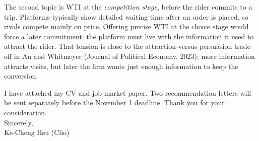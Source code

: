 \documentclass[11pt,letterpaper]{article}
\begin{document}
The second topic is WTI at the \textit{competition stage}, before the rider commits to a trip. Platforms typically show detailed waiting time after an order is placed, so rivals compete mainly on price. Offering precise WTI at the choice stage would force a later commitment: the platform must live with the information it used to attract the rider. That tension is close to the attraction-versus-persuasion trade-off in Au and Whitmeyer (Journal of Political Economy, 2023): more information attracts visits, but later the firm wants just enough information to keep the conversion.

I have attached my CV and job-market paper. Two recommendation letters will be sent separately before the November 1 deadline. Thank you for your consideration.\\[0.4em]
Sincerely,\\[0.5em]
Ke-Cheng Hsu (Clio)
\end{document}
